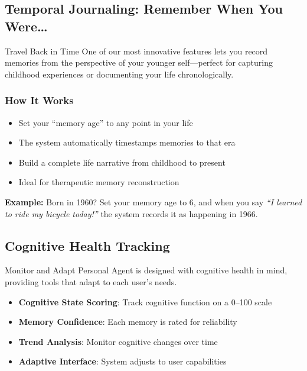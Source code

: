 \documentclass[11pt,letterpaper]{article}
\begin{document}
\subsection{Temporal Journaling: Remember When You Were\ldots}

\begin{featurebox}{Travel Back in Time}
One of our most innovative features lets you record memories from the perspective of your younger self---perfect for capturing childhood experiences or documenting your life chronologically.
\end{featurebox}

\subsubsection{How It Works}
\begin{itemize}[leftmargin=*]
    \item Set your ``memory age'' to any point in your life
    \item The system automatically timestamps memories to that era
    \item Build a complete life narrative from childhood to present
    \item Ideal for therapeutic memory reconstruction
\end{itemize}

\textbf{Example:} Born in 1960? Set your memory age to 6, and when you say \textit{``I learned to ride my bicycle today!''} the system records it as happening in 1966.

\subsection{Cognitive Health Tracking}

\begin{featurebox}{Monitor and Adapt}
Personal Agent is designed with cognitive health in mind, providing tools that adapt to each user's needs.
\end{featurebox}

\begin{itemize}[leftmargin=*]
    \item \textbf{Cognitive State Scoring}: Track cognitive function on a 0--100 scale
    \item \textbf{Memory Confidence}: Each memory is rated for reliability
    \item \textbf{Trend Analysis}: Monitor cognitive changes over time
    \item \textbf{Adaptive Interface}: System adjusts to user capabilities
\end{itemize}
\end{document}
